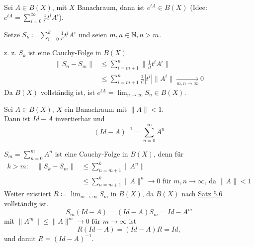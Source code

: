 \newpage %

\begin{bemerkung}[Exponentialfunktion]
	Sei $A \in B(X)$, mit $X$ Banachraum, dann ist $e^{tA} \in B(X)$ (Idee: $e^{tA} = \sum_{i = 0}^{\infty} \frac{1}{i!} t^{i} A^{i}$).
	\begin{beweis}
		Setze $S_{k} \coloneqq \sum_{i = 0}^{k} \frac{1}{i!} t^{i} A^{i}$ und seien $m, n \in \mathbb{N}, n > m$.
	
		z. z. $S_{k}$ ist eine Cauchy-Folge in $B(X)$
		\begin{align*}
			\| S_{n} - S_{m} \| & \leq \sum_{i = m + 1}^{n} \| \frac{1}{i!} t^{i} A^{i} \| \\
				& \leq \sum_{i = m +1}^{n}  \frac{1}{i!} | t^{i} | \| A^{i} \| \xrightarrow[m, n \rightarrow \infty]{} 0
		\end{align*}
		Da $B(X)$ vollständig ist, ist $e^{tA} = \lim_{n \rightarrow \infty} S_{n} \in B(X)$.	
	\end{beweis}
\end{bemerkung}


\begin{prop} \label{prop:5.8-NeumannscheReihe}
	Sei $A \in B(X)$, $X$ ein Banachraum mit $\| A \| < 1$. \\
	Dann ist $Id - A$ invertierbar und 
	\[ \left( Id - A \right)^{-1} = \sum_{n = 0}^{\infty} A^{n} \]
	\begin{beweis}
		$S_{m} = \sum_{n = 0}^{m} A^{n}$ ist eine Cauchy-Folge in $B(X)$, denn für
		\begin{align*}
		k > m: \quad \| S_{k} - S_{m} \| & \leq \sum_{n = m + 1}^{k} \| A^{n} \| \\
			& \leq \sum_{n = m + 1}^{k} \| A \|^{n} \rightarrow 0 \text{ für } m, n \rightarrow \infty \text{, da } \| A \| < 1
		\end{align*}
		Weiter existiert $R \coloneqq \lim_{m \rightarrow \infty} S_{m}$ in $B(X)$, da $B(X)$ nach \hyperref[satz:5.6]{Satz 5.6} vollständig ist.
		\[ S_{m} (Id - A) = (Id - A) S_{m} = Id - A^{m} \]
		mit $\| A^{m} \| \leq \| A \|^{m} \rightarrow 0 \text{ für } m \rightarrow \infty$ ist
		\[ R (Id - A) = (Id - A) R = Id, \]
		und damit $R = (Id - A)^{-1}$.
	\end{beweis}
\end{prop}


